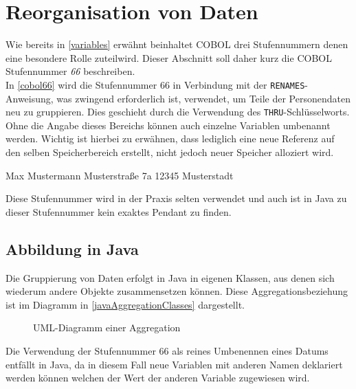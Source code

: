 \section{Reorganisation von Daten}

Wie bereits in \autoref{variables} erwähnt beinhaltet COBOL drei Stufennummern denen eine besondere Rolle zuteilwird. Dieser Abschnitt soll daher kurz die COBOL Stufennummer \textit{66} beschreiben.\\

In \autoref{cobol66} wird die Stufennummer 66 in Verbindung mit der \texttt{RENAMES}-Anweisung, was zwingend erforderlich ist, verwendet, um Teile der Personendaten neu zu gruppieren. Dies geschieht durch die Verwendung des \texttt{THRU}-Schlüsselworts. Ohne die Angabe dieses Bereichs können auch einzelne Variablen umbenannt werden. Wichtig ist hierbei zu erwähnen, dass lediglich eine neue Referenz auf den selben Speicherbereich erstellt, nicht jedoch neuer Speicher alloziert wird.

\begin{shellwindow}
Max       Mustermann
Musterstraße  7a   12345 Musterstadt   
\end{shellwindow}

Diese Stufennummer wird in der Praxis selten verwendet und auch ist in Java zu dieser Stufennummer kein exaktes Pendant zu finden. 

\subsection*{Abbildung in Java}
Die Gruppierung von Daten erfolgt in Java in eigenen Klassen, aus denen sich wiederum andere Objekte zusammensetzen können. Diese Aggregationsbeziehung ist im Diagramm in \autoref{javaAggregationClasses} dargestellt. \\

\begin{figure}[H]
    \centering
    \caption{UML-Diagramm einer Aggregation}
    \label{javaAggregationClasses}
\end{figure}

Die Verwendung der Stufennummer 66 als reines Umbenennen eines Datums entfällt in Java, da in diesem Fall neue Variablen mit anderen Namen deklariert werden können welchen der Wert der anderen Variable zugewiesen wird.\\